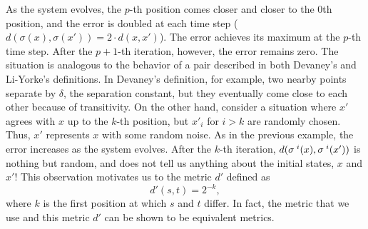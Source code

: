 \documentclass[10pt,twoside]{book}
\begin{document}
As the system evolves, the $p$-th position comes closer and closer to the 0th position, and the error is doubled at each time step ($d(\sigma(x), \sigma(x')) = 2 \cdot d(x, x')$).
The error achieves its maximum at the $p$-th time step.
After the $p+1$-th iteration, however, the error remains zero.
The situation is analogous to the behavior of a pair described in both Devaney's and Li-Yorke's definitions.
In Devaney's definition, for example, two nearby points separate by $\delta$, the separation constant, but they eventually come close to each other because of transitivity.
On the other hand, consider a situation where $x'$ agrees with $x$ up to the $k$-th position, but $x'_i$ for $i > k$ are randomly chosen.
Thus, $x'$ represents $x$ with some random noise.
As in the previous example, the error increases as the system evolves.
After the $k$-th iteration, $d(\sigma^{\;i}(x), \sigma^{\;i}(x'))$ is nothing but random, and does not tell us anything about the initial states, $x$ and $x'$!
This observation motivates us to the metric $d'$ defined as
\begin{equation*}
  d'(s,t) = 2^{-k},
\end{equation*}
where $k$ is the first position at which $s$ and $t$ differ.
In fact, the metric that we use and this metric $d'$ can be shown to be equivalent metrics.
\end{document}
